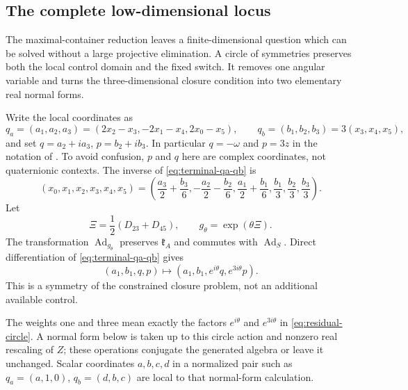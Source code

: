 \documentclass[11pt,a4paper]{article}
\newcommand{\Ad}{\operatorname{Ad}}
\begin{document}
\subsection{The complete low-dimensional locus}
The maximal-container reduction leaves a finite-dimensional question which can be solved without a large projective elimination.  A circle of symmetries preserves both the local control domain and the fixed switch.  It removes one angular variable and turns the three-dimensional closure condition into two elementary real normal forms.

Write the local coordinates as
\begin{equation}
 q_a=(a_1,a_2,a_3)=(2x_2-x_3,-2x_1-x_4,2x_0-x_5),\qquad
 q_b=(b_1,b_2,b_3)=3(x_3,x_4,x_5),
 \label{eq:terminal-qa-qb}
\end{equation}
and set $q=a_2+ia_3$, $p=b_2+ib_3$.  In particular $q=-\omega$ and $p=3z$ in the notation of .  To avoid confusion, $p$ and $q$ here are complex coordinates, not quaternionic contexts.  The inverse of \eqref{eq:terminal-qa-qb} is
\[
(x_0,x_1,x_2,x_3,x_4,x_5)
=\left(\frac{a_3}{2}+\frac{b_3}{6},
-\frac{a_2}{2}-\frac{b_2}{6},\frac{a_1}{2}+\frac{b_1}{6},
\frac{b_1}{3},\frac{b_2}{3},\frac{b_3}{3}\right).
\]
  Let
\[
 \Xi=\frac12(D_{23}+D_{45}),\qquad g_\theta=\exp(\theta\Xi).
\]
The transformation $\Ad_{g_\theta}$ preserves $\mathfrak k_A$ and commutes with $\Ad_S$.  Direct differentiation of \eqref{eq:terminal-qa-qb} gives
\begin{equation}
 (a_1,b_1,q,p)\longmapsto(a_1,b_1,e^{i\theta}q,e^{3i\theta}p).
 \label{eq:residual-circle}
\end{equation}
This is a symmetry of the constrained closure problem, not an additional available control.

The weights one and three mean exactly the factors $e^{i\theta}$ and $e^{3i\theta}$ in \eqref{eq:residual-circle}.  A normal form below is taken up to this circle action and nonzero real rescaling of $Z$; these operations conjugate the generated algebra or leave it unchanged.  Scalar coordinates $a,b,c,d$ in a normalized pair such as $q_a=(a,1,0)$, $q_b=(d,b,c)$ are local to that normal-form calculation.
\end{document}
